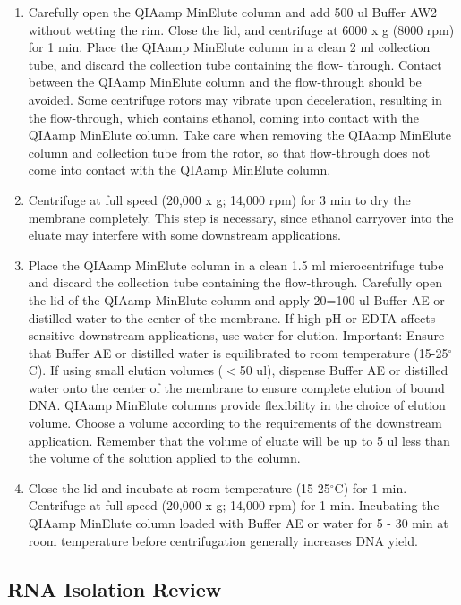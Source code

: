 \documentclass[11pt, oneside]{article}
\begin{document}
\begin{enumerate}[leftmargin=.5in]
			\item Carefully open the QIAamp MinElute column and add 500 ul Buffer AW2 without wetting the rim. Close the lid, and centrifuge at 6000 x 			g (8000 rpm) for 1 min. Place the QIAamp MinElute column in a clean 2 ml collection tube, and discard the collection tube containing the flow-			through. Contact between the QIAamp MinElute column and the flow-through should be avoided. Some centrifuge rotors may vibrate upon 			deceleration, resulting in the flow-through, which contains ethanol, coming into contact with the QIAamp MinElute column. Take care when 			removing the QIAamp MinElute column and collection tube from the rotor, so that flow-through does not come into contact with the QIAamp 			MinElute column.
			\item Centrifuge at full speed (20,000 x g; 14,000 rpm) for 3 min to dry the membrane completely. This step is necessary, since ethanol 				carryover into the eluate may interfere with some downstream applications.
			\item Place the QIAamp MinElute column in a clean 1.5 ml microcentrifuge tube and discard the collection tube containing the flow-through. 			Carefully open the lid of the QIAamp MinElute column and apply 20=100 ul Buffer AE or distilled water to the center of the membrane. If high 			pH or EDTA affects sensitive downstream applications, use water for elution. Important: Ensure that Buffer AE or distilled water is equilibrated 			to room temperature (15-25$^{\circ}$C). If using small elution volumes ($<$50 ul), dispense Buffer AE or distilled water onto the center of the 			membrane to ensure complete elution of bound DNA. QIAamp MinElute columns provide flexibility in the choice of elution volume. Choose a 			volume according to the requirements of the downstream application. Remember that the volume of eluate will be up to 5 ul less than the 				volume of the solution applied to the column.
			\item Close the lid and incubate at room temperature (15-25$^{\circ}$C) for 1 min. Centrifuge at
			full speed (20,000 x g; 14,000 rpm) for 1 min. Incubating the QIAamp MinElute column loaded with Buffer AE or water for 5 - 30 min at room 			temperature before centrifugation generally increases DNA yield.
		\end{enumerate}
	
	\newpage

	\subsection{RNA Isolation Review}
\end{document}
